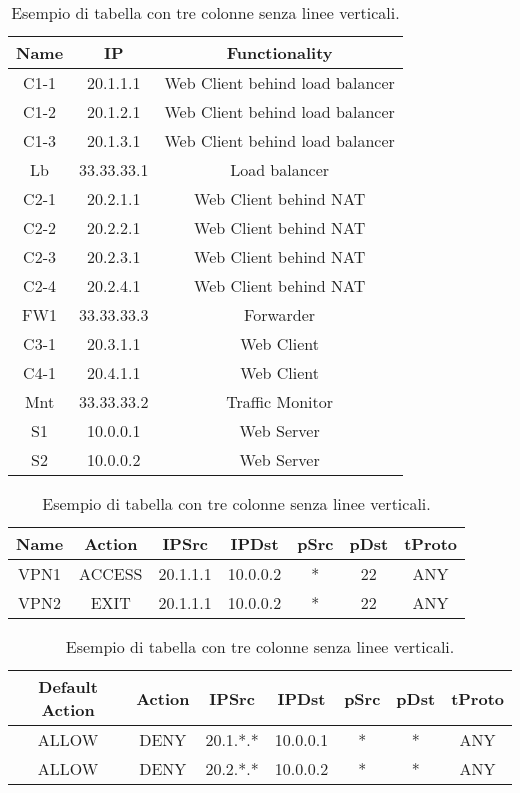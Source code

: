 \begin{table}
    \centering
    \begin{tabular}{ccc}
        \hline
         Name & IP & Functionality \\
        \hline
        C1-1 & 20.1.1.1 & Web Client behind load balancer \\
        C1-2 & 20.1.2.1 & Web Client behind load balancer \\
        C1-3 & 20.1.3.1 & Web Client behind load balancer \\
        Lb & 33.33.33.1 & Load balancer \\ 
        C2-1 & 20.2.1.1 & Web Client behind NAT \\
        C2-2 & 20.2.2.1 & Web Client behind NAT \\
        C2-3 & 20.2.3.1 & Web Client behind NAT \\
        C2-4 & 20.2.4.1 & Web Client behind NAT \\
        FW1 & 33.33.33.3 & Forwarder \\
        C3-1 & 20.3.1.1 & Web Client \\
        C4-1 & 20.4.1.1 & Web Client \\
        Mnt & 33.33.33.2 & Traffic Monitor \\
        S1 & 10.0.0.1 & Web Server \\
        S2 & 10.0.0.2 & Web Server \\
        \hline
    \end{tabular}
    \caption{Esempio di tabella con tre colonne senza linee verticali.}
    \label{tab:tabella}
\end{table}

\begin{table}
    \centering
    \begin{tabular}{ccccccc}
        \hline
         Name & Action & IPSrc & IPDst & pSrc & pDst & tProto \\
        \hline
        VPN1 & ACCESS & 20.1.1.1 & 10.0.0.2 & * & 22 & ANY \\
        VPN2 & EXIT & 20.1.1.1 & 10.0.0.2 & * & 22 & ANY \\
        \hline
    \end{tabular}
    \caption{Esempio di tabella con tre colonne senza linee verticali.}
    \label{tab:tabella}
\end{table}

\begin{table}
    \centering
    \begin{tabular}{ccccccc}
        \hline
        Default Action & Action & IPSrc & IPDst & pSrc & pDst & tProto \\
        \hline
        ALLOW & DENY & 20.1.*.* & 10.0.0.1 & * & * & ANY \\
        ALLOW & DENY & 20.2.*.* & 10.0.0.2 & * & * & ANY  \\
        \hline
    \end{tabular}
    \caption{Esempio di tabella con tre colonne senza linee verticali.}
    \label{tab:tabella}
\end{table}
